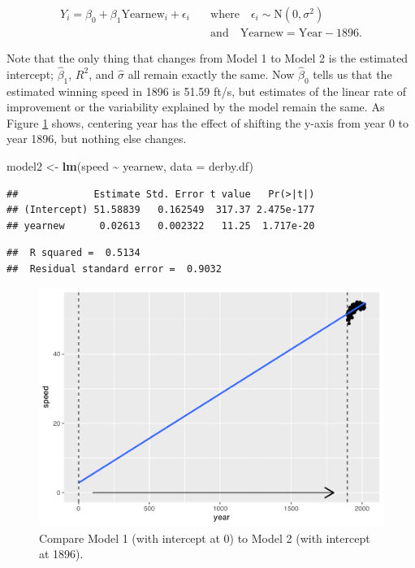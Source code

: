 \documentclass[
]{krantz}
\newenvironment{Shaded}{\begin{snugshade}}{\end{snugshade}}
\newcommand{\AttributeTok}[1]{\textcolor[rgb]{0.27,0.27,0.27}{#1}}
\newcommand{\FunctionTok}[1]{\textcolor[rgb]{0.27,0.27,0.27}{\textbf{#1}}}
\newcommand{\NormalTok}[1]{#1}
\newcommand{\OtherTok}[1]{\textcolor[rgb]{0.37,0.37,0.37}{#1}}
\newcommand{\SpecialCharTok}[1]{\textcolor[rgb]{0.43,0.43,0.43}{\textbf{#1}}}
\begin{document}
\begin{equation*}
\begin{split}
Y_{i}=\beta_{0}+\beta_{1}\textrm{Yearnew}_{i}+\epsilon_{i}\quad &\textrm{where} \quad \epsilon_{i}\sim \textrm{N}(0,\sigma^2) \\
    &\textrm{and} \quad \textrm{Yearnew}=\textrm{Year}-1896.
\end{split}
\end{equation*}

Note that the only thing that changes from Model 1 to Model 2 is the estimated intercept; \(\hat{\beta}_{1}\), \(R^2\), and \(\hat{\sigma}\) all remain exactly the same. Now \(\hat{\beta}_{0}\) tells us that the estimated winning speed in 1896 is 51.59 ft/s, but estimates of the linear rate of improvement or the variability explained by the model remain the same. As Figure \ref{fig:center} shows, centering year has the effect of shifting the y-axis from year 0 to year 1896, but nothing else changes.

\begin{Shaded}
\begin{Highlighting}[]
\NormalTok{model2 }\OtherTok{\textless{}{-}} \FunctionTok{lm}\NormalTok{(speed }\SpecialCharTok{\textasciitilde{}}\NormalTok{ yearnew, }\AttributeTok{data =}\NormalTok{ derby.df)}
\end{Highlighting}
\end{Shaded}

\begin{verbatim}
##             Estimate Std. Error t value   Pr(>|t|)
## (Intercept) 51.58839   0.162549  317.37 2.475e-177
## yearnew      0.02613   0.002322   11.25  1.717e-20
\end{verbatim}

\begin{verbatim}
##  R squared =  0.5134 
##  Residual standard error =  0.9032
\end{verbatim}

\begin{figure}

{\centering \includegraphics[width=0.9\linewidth]{bookdown-BeyondMLR_files/figure-latex/center-1} 

}

\caption{Compare Model 1 (with intercept at 0) to Model 2 (with intercept at 1896).}\label{fig:center}
\end{figure}
\end{document}
